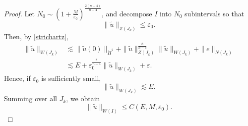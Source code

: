 \documentclass[11pt,a4paper]{article}
\numberwithin{equation}{section}
\begin{document}
\begin{proof}
Let $N_{0} \sim \left( 1 + \frac{M}{\varepsilon_{0}} \right)^{\frac{2(n+4)}{n-4}}$, and decompose $I$ into $N_{0}$ subintervals so that
\[
\|\tilde{u}\|_{Z(J_{k})} \leq \varepsilon_{0}.
\]
Then, by \eqref{strichartz},
\begin{align*}
\|\tilde{u}\|_{W(J_{k})}
&\lesssim \|\tilde{u}(0)\|_{\dot{H}^{2}} + \|\tilde{u}\|_{Z(J_{k})}^{\frac{8}{n-4}}\|\tilde{u}\|_{W(J_{k})} + \|e\|_{N(J_{k})} \\
&\lesssim E + \varepsilon_{0}^{\frac{8}{n-4}}\|\tilde{u}\|_{W(J_{k})} + \varepsilon.
\end{align*}
Hence, if $\varepsilon_{0}$ is sufficiently small,
\[
\|\tilde{u}\|_{W(J_{k})} \lesssim E.
\]
Summing over all $J_{k}$, we obtain
\[
\|\tilde{u}\|_{W(I)} \leq C(E, M, \varepsilon_{0}).
\]


\end{proof}
\end{document}
